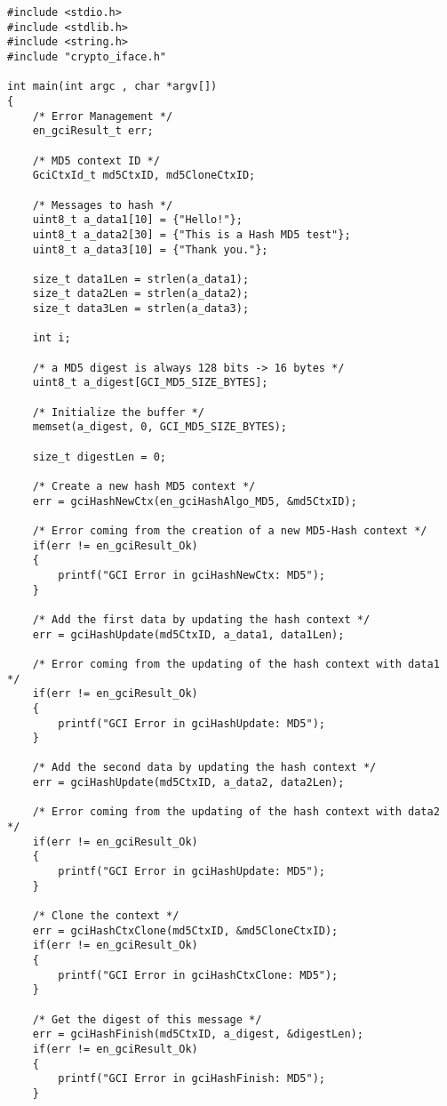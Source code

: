 \begin{lstlisting}
#include <stdio.h>
#include <stdlib.h>
#include <string.h>
#include "crypto_iface.h"

int main(int argc , char *argv[])
{
    /* Error Management */
    en_gciResult_t err;

    /* MD5 context ID */
    GciCtxId_t md5CtxID, md5CloneCtxID;

    /* Messages to hash */
    uint8_t a_data1[10] = {"Hello!"};
    uint8_t a_data2[30] = {"This is a Hash MD5 test"};
    uint8_t a_data3[10] = {"Thank you."};

    size_t data1Len = strlen(a_data1);
    size_t data2Len = strlen(a_data2);
    size_t data3Len = strlen(a_data3);

    int i;

    /* a MD5 digest is always 128 bits -> 16 bytes */
    uint8_t a_digest[GCI_MD5_SIZE_BYTES];

    /* Initialize the buffer */
    memset(a_digest, 0, GCI_MD5_SIZE_BYTES);

    size_t digestLen = 0;

    /* Create a new hash MD5 context */
    err = gciHashNewCtx(en_gciHashAlgo_MD5, &md5CtxID);

    /* Error coming from the creation of a new MD5-Hash context */
    if(err != en_gciResult_Ok)
    {
        printf("GCI Error in gciHashNewCtx: MD5");
    }

    /* Add the first data by updating the hash context */
    err = gciHashUpdate(md5CtxID, a_data1, data1Len);

    /* Error coming from the updating of the hash context with data1 */
    if(err != en_gciResult_Ok)
    {
        printf("GCI Error in gciHashUpdate: MD5");
    }

    /* Add the second data by updating the hash context */
    err = gciHashUpdate(md5CtxID, a_data2, data2Len);

    /* Error coming from the updating of the hash context with data2 */
    if(err != en_gciResult_Ok)
    {
        printf("GCI Error in gciHashUpdate: MD5");
    }

    /* Clone the context */
    err = gciHashCtxClone(md5CtxID, &md5CloneCtxID);
    if(err != en_gciResult_Ok)
    {
        printf("GCI Error in gciHashCtxClone: MD5");
    }

    /* Get the digest of this message */
    err = gciHashFinish(md5CtxID, a_digest, &digestLen);
    if(err != en_gciResult_Ok)
    {
        printf("GCI Error in gciHashFinish: MD5");
    }


\end{lstlisting}
